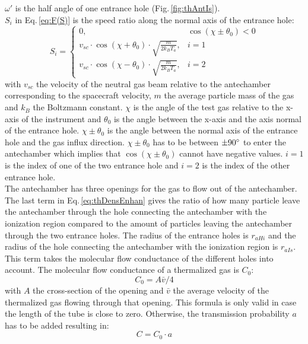 		$\omega'$ is the half angle of one entrance hole (Fig.\,\ref{fig:thAntIs}).\\
		$S_i$ in Eq.\,\eqref{eq:F(S)} is the speed ratio along the normal axis of the entrance hole:
		\begin{equation}
			S_i = 
			\begin{cases}
				0, & \cos(\chi \pm \theta_0) < 0\\
				v_{sc}\cdot \cos(\chi + \theta_0)\cdot \sqrt{\frac{m}{2k_B T_a}}, & i=1\\
				v_{sc}\cdot \cos(\chi - \theta_0)\cdot \sqrt{\frac{m}{2k_B T_a}}, & i=2
			\end{cases}
		\end{equation}
		with $v_{sc}$ the velocity of the neutral gas beam relative to the antechamber corresponding to the spacecraft velocity, $m$ the average particle mass of the gas and $k_B$ the Boltzmann constant. $\chi$ is the angle of the test gas relative to the x-axis of the instrument and $\theta_0$ is the angle between the x-axis and the axis normal of the entrance hole. $\chi \pm \theta_0$ is the angle between the normal axis of the entrance hole and the gas influx direction. $\chi \pm \theta_0$ has to be between $\pm 90^\circ$ to enter the antechamber which implies that $\cos(\chi \pm \theta_0)$ cannot have negative values. $i=1$ is the index of one of the two entrance hole and $i=2$ is the index of the other entrance hole.\\ 
		The antechamber has three openings for the gas to flow out of the antechamber. The last term in Eq.\,\eqref{eq:thDensEnhan} gives the ratio of how many particle leave the antechamber through the hole connecting the antechamber with the ionization region compared to the amount of particles leaving the antechamber through the two entrance holes. The radius of the entrance holes is $r_{aHi}$ and the radius of the hole connecting the antechamber with the ionization region is $r_{aIs}$. This term takes the molecular flow conductance of the different holes into account. The molecular flow conductance of a thermalized gas is $C_0$:
		\begin{equation}
			C_0 = A\bar{v}/4
			\label{eq:theoMolFlowCondC0}
		\end{equation}
		with $A$ the cross-section of the opening and $\bar{v}$ the average velocity of the thermalized gas flowing through that opening. This formula is only valid in case the length of the tube is close to zero. Otherwise, the transmission probability $a$ has to be added resulting in:
		\begin{equation}
			C = C_0 \cdot a
			\label{eq:theoMolFlowCondCEff}
		\end{equation}
				

